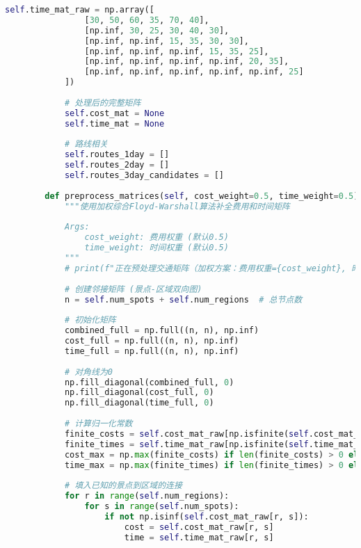 \begin{lstlisting}[language=Python]
            self.time_mat_raw = np.array([
                [30, 50, 60, 35, 70, 40],
                [np.inf, 30, 25, 30, 40, 30],
                [np.inf, np.inf, 15, 35, 30, 30],
                [np.inf, np.inf, np.inf, 15, 35, 25],
                [np.inf, np.inf, np.inf, np.inf, 20, 35],
                [np.inf, np.inf, np.inf, np.inf, np.inf, 25]
            ])
            
            # 处理后的完整矩阵
            self.cost_mat = None
            self.time_mat = None
            
            # 路线相关
            self.routes_1day = []
            self.routes_2day = []
            self.routes_3day_candidates = []
            
        def preprocess_matrices(self, cost_weight=0.5, time_weight=0.5):
            """使用加权综合Floyd-Warshall算法补全费用和时间矩阵
            
            Args:
                cost_weight: 费用权重 (默认0.5)
                time_weight: 时间权重 (默认0.5)
            """
            # print(f"正在预处理交通矩阵（加权方案：费用权重={cost_weight}, 时间权重={time_weight}）...") # 避免过多打印
            
            # 创建邻接矩阵 (景点-区域双向图)
            n = self.num_spots + self.num_regions  # 总节点数
            
            # 初始化矩阵
            combined_full = np.full((n, n), np.inf)
            cost_full = np.full((n, n), np.inf)
            time_full = np.full((n, n), np.inf)
            
            # 对角线为0
            np.fill_diagonal(combined_full, 0)
            np.fill_diagonal(cost_full, 0)
            np.fill_diagonal(time_full, 0)
            
            # 计算归一化常数
            finite_costs = self.cost_mat_raw[np.isfinite(self.cost_mat_raw)]
            finite_times = self.time_mat_raw[np.isfinite(self.time_mat_raw)]
            cost_max = np.max(finite_costs) if len(finite_costs) > 0 else 100
            time_max = np.max(finite_times) if len(finite_times) > 0 else 100
            
            # 填入已知的景点到区域的连接
            for r in range(self.num_regions):
                for s in range(self.num_spots):
                    if not np.isinf(self.cost_mat_raw[r, s]):
                        cost = self.cost_mat_raw[r, s]
                        time = self.time_mat_raw[r, s]
                        

\end{lstlisting}
